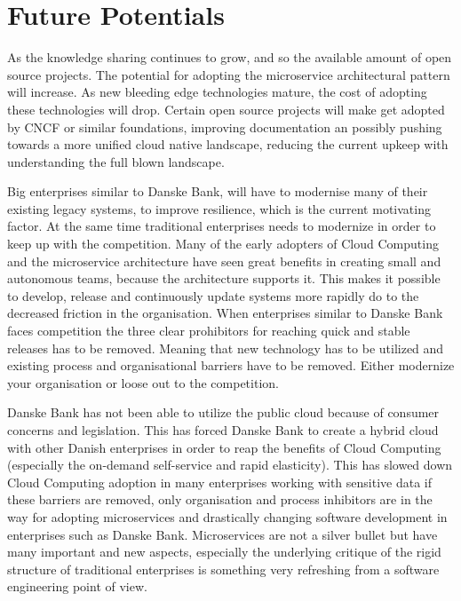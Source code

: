 \section{Future Potentials}
As the knowledge sharing continues to grow, and so the available amount of open source projects. The potential for adopting the microservice architectural pattern will increase. As new bleeding edge technologies mature, the cost of adopting these technologies will drop. Certain open source projects will make get adopted by CNCF or similar foundations, improving documentation an possibly pushing towards a more unified cloud native landscape, reducing the current upkeep with understanding the full blown landscape.

Big enterprises similar to Danske Bank, will have to modernise many of their existing legacy systems, to improve resilience, which is the current motivating factor. At the same time traditional enterprises needs to modernize in order to keep up with the competition. Many of the early adopters of Cloud Computing and the microservice architecture have seen great benefits in creating small and autonomous teams, because the architecture supports it. This makes it possible to develop, release and continuously update systems more rapidly do to the decreased friction in the organisation. When enterprises similar to Danske Bank faces competition the three clear prohibitors for reaching quick and stable releases has to be removed. Meaning that new technology has to be utilized and existing process and organisational barriers have to be removed. Either modernize your organisation or loose out to the competition.

Danske Bank has not been able to utilize the public cloud because of consumer concerns and legislation. This has forced Danske Bank to create a hybrid cloud with other Danish enterprises in order to reap the benefits of Cloud Computing (especially the on-demand self-service and rapid elasticity). This has slowed down Cloud Computing adoption in many enterprises working with sensitive data if these barriers are removed, only organisation and process inhibitors are in the way for adopting microservices and drastically changing software development in enterprises such as Danske Bank. Microservices are not a silver bullet but have many important and new aspects, especially the underlying critique of the rigid structure of traditional enterprises is something very refreshing from a software engineering point of view.




